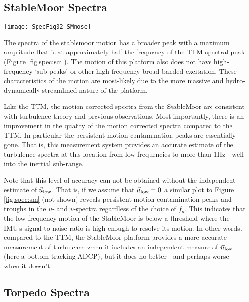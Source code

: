 \subsection{StableMoor Spectra}

\begin{figure*}[t]
  \centering
  \texttt{[image: SpecFig02\_SMnose]}
  \caption{Turbulence spectra from the StableMoor buoy. The axes-layout and annotations are identical to Figure \ref{fig:spec:ttm}.}
  \label{fig:spec:sm}
\end{figure*}

The spectra of the stablemoor motion has a broader peak with a maximum amplitude that is at approximately half the frequency of the TTM spectral peak (Figure \ref{fig:spec:sm}). The motion of this platform also does not have high-frequency `sub-peaks' or other high-frequency broad-banded excitation. These characteristics of the motion are most-likely due to the more massive and hydro-dynamically streamlined nature of the platform. 

Like the TTM, the motion-corrected spectra from the StableMoor are consistent with turbulence theory and previous observations. Most importantly, there is an improvement in the quality of the motion corrected spectra compared to the TTM. In particular the persistent motion contamination peaks are essentially gone. That is, this measurement system provides an accurate estimate of the turbulence spectra at this location from low frequencies to more than 1Hz---well into the inertial sub-range.

Note that this level of accuracy can not be obtained without the independent estimate of $\vec{u}_\mathrm{low}$. That is, if we assume that $\vec{u}_\mathrm{low}=0$ a similar plot to Figure \ref{fig:spec:sm} (not shown) reveals persistent motion-contamination peaks and troughs in the $u$- and $v$-spectra regardless of the choice of $f_a$. This indicates that the low-frequency motion of the StableMoor is below a threshold where the IMU's signal to noise ratio is high enough to resolve its motion. In other words, compared to the TTM, the StableMoor platform provides a more accurate measurement of turbulence when it includes an independent measure of $\vec{u}_\mathrm{low}$ (here a bottom-tracking ADCP), but it does no better---and perhaps worse---when it doesn't.

\subsection{Torpedo Spectra}

